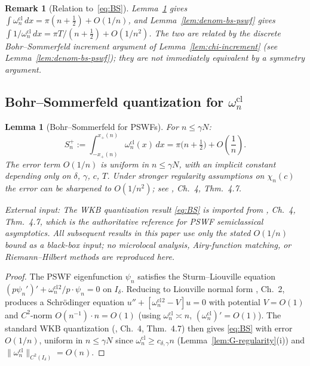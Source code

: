 \documentclass[12pt,a4paper]{amsart}
\newtheorem{lemma}[theorem]{Lemma}
\newtheorem{remark}[theorem]{Remark}
\newcommand{\psin}{\psi_n}
\newcommand{\wncl}{\omega_n^{\mathrm{cl}}}
\begin{document}
\begin{remark}[Relation to~\eqref{eq:BS}]\label{rem:denom-vs-BS}
Lemma~\ref{lem:bohr-sommerfeld-pswf} gives
$\int\wncl\,dx = \pi(n+\tfrac{1}{2}) + O(1/n)$,
and Lemma~\ref{lem:denom-bs-pswf} gives
$\int 1/\wncl\,dx = \pi T/(n+\tfrac{1}{2}) + O(1/n^2)$.
The two are related by the discrete Bohr--Sommerfeld increment
argument of Lemma~\ref{lem:chi-increment}
(see Lemma~\ref{lem:denom-bs-pswf});
they are \emph{not} immediately equivalent by a symmetry argument.
\end{remark}

\subsection{Bohr--Sommerfeld quantization for $\wncl$}

\begin{lemma}[Bohr--Sommerfeld for PSWFs]%
\label{lem:bohr-sommerfeld-pswf}
For $n \le \gamma N$:
\begin{equation}\label{eq:BS}
  S^+_n := \int_{-x_+(n)}^{x_+(n)} \wncl(x)\,dx
  = \pi\bigl(n + \tfrac{1}{2}\bigr)
    + O\!\left(\frac{1}{n}\right).
\end{equation}
The error term $O(1/n)$ is uniform in $n \le \gamma N$,
with an implicit constant depending only on
$\delta$, $\gamma$, $c$, $T$.
Under stronger regularity assumptions on $\chi_n(c)$
the error can be sharpened to $O(1/n^2)$;
see \cite{OsipovRokhlinXiao}, Ch.~4, Thm.~4.7.

\emph{External input:} The WKB quantization result
\eqref{eq:BS} is imported from
\cite{OsipovRokhlinXiao}, Ch.~4, Thm.~4.7,
which is the authoritative reference for PSWF semiclassical
asymptotics. All subsequent results in this paper use only
the stated $O(1/n)$ bound as a black-box input;
no microlocal analysis, Airy-function matching, or
Riemann--Hilbert methods are reproduced here.
\end{lemma}

\begin{proof}
The PSWF eigenfunction $\psin$ satisfies the Sturm--Liouville
equation $(p\psin')' + \wncl^2/p\cdot\psin = 0$ on $I_\delta$.
Reducing to Liouville normal form \cite{Levitan}, Ch.~2,
produces a Schr\"odinger equation $u'' + [\wncl^2 - V]u = 0$
with potential $V = O(1)$ and $C^2$-norm $O(n^{-1})\cdot n = O(1)$
(using $\wncl \asymp n$, $(\wncl)' = O(1)$).
The standard WKB quantization
(\cite{OsipovRokhlinXiao}, Ch.~4, Thm.~4.7)
then gives \eqref{eq:BS} with error $O(1/n)$,
uniform in $n \le \gamma N$ since
$\wncl \ge c_{\delta,\gamma}n$ (Lemma~\ref{lem:G-regularity}(i))
and $\|\wncl\|_{C^2(I_\delta)} = O(n)$.
\end{proof}
\end{document}

